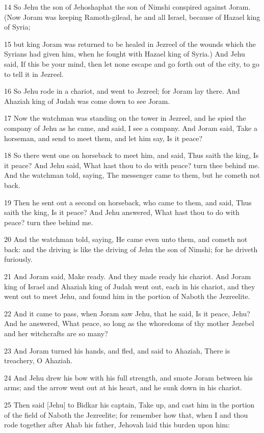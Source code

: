 \par 14 So Jehu the son of Jehoshaphat the son of Nimshi conspired against Joram. (Now Joram was keeping Ramoth-gilead, he and all Israel, because of Hazael king of Syria;
\par 15 but king Joram was returned to be healed in Jezreel of the wounds which the Syrians had given him, when he fought with Hazael king of Syria.) And Jehu said, If this be your mind, then let none escape and go forth out of the city, to go to tell it in Jezreel.
\par 16 So Jehu rode in a chariot, and went to Jezreel; for Joram lay there. And Ahaziah king of Judah was come down to see Joram.
\par 17 Now the watchman was standing on the tower in Jezreel, and he spied the company of Jehu as he came, and said, I see a company. And Joram said, Take a horseman, and send to meet them, and let him say, Is it peace?
\par 18 So there went one on horseback to meet him, and said, Thus saith the king, Is it peace? And Jehu said, What hast thou to do with peace? turn thee behind me. And the watchman told, saying, The messenger came to them, but he cometh not back.
\par 19 Then he sent out a second on horseback, who came to them, and said, Thus saith the king, Is it peace? And Jehu answered, What hast thou to do with peace? turn thee behind me.
\par 20 And the watchman told, saying, He came even unto them, and cometh not back: and the driving is like the driving of Jehu the son of Nimshi; for he driveth furiously.
\par 21 And Joram said, Make ready. And they made ready his chariot. And Joram king of Israel and Ahaziah king of Judah went out, each in his chariot, and they went out to meet Jehu, and found him in the portion of Naboth the Jezreelite.
\par 22 And it came to pass, when Joram saw Jehu, that he said, Is it peace, Jehu? And he answered, What peace, so long as the whoredoms of thy mother Jezebel and her witchcrafts are so many?
\par 23 And Joram turned his hands, and fled, and said to Ahaziah, There is treachery, O Ahaziah.
\par 24 And Jehu drew his bow with his full strength, and smote Joram between his arms; and the arrow went out at his heart, and he sunk down in his chariot.
\par 25 Then said [Jehu] to Bidkar his captain, Take up, and cast him in the portion of the field of Naboth the Jezreelite; for remember how that, when I and thou rode together after Ahab his father, Jehovah laid this burden upon him:
